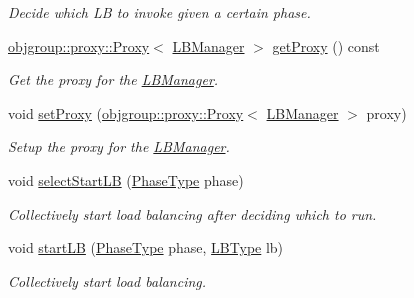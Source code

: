 \begin{DoxyCompactItemize}
\begin{DoxyCompactList}\small\item\em Decide which LB to invoke given a certain phase. \end{DoxyCompactList}\item 
\hyperlink{structvt_1_1objgroup_1_1proxy_1_1_proxy}{objgroup\+::proxy\+::\+Proxy}$<$ \hyperlink{structvt_1_1vrt_1_1collection_1_1balance_1_1_l_b_manager}{L\+B\+Manager} $>$ \hyperlink{structvt_1_1vrt_1_1collection_1_1balance_1_1_l_b_manager_aa0fbba6d90873e5fa6e40767efcabb5c}{get\+Proxy} () const
\begin{DoxyCompactList}\small\item\em Get the proxy for the \hyperlink{structvt_1_1vrt_1_1collection_1_1balance_1_1_l_b_manager}{L\+B\+Manager}. \end{DoxyCompactList}\item 
void \hyperlink{structvt_1_1vrt_1_1collection_1_1balance_1_1_l_b_manager_aacef5b639acd9d984b9bcb79ecb9c6a9}{set\+Proxy} (\hyperlink{structvt_1_1objgroup_1_1proxy_1_1_proxy}{objgroup\+::proxy\+::\+Proxy}$<$ \hyperlink{structvt_1_1vrt_1_1collection_1_1balance_1_1_l_b_manager}{L\+B\+Manager} $>$ proxy)
\begin{DoxyCompactList}\small\item\em Setup the proxy for the \hyperlink{structvt_1_1vrt_1_1collection_1_1balance_1_1_l_b_manager}{L\+B\+Manager}. \end{DoxyCompactList}\item 
void \hyperlink{structvt_1_1vrt_1_1collection_1_1balance_1_1_l_b_manager_aa21017c4513b87dccff2c3f0b12b00b4}{select\+Start\+LB} (\hyperlink{namespacevt_a46ce6733d5cdbd735d561b7b4029f6d7}{Phase\+Type} phase)
\begin{DoxyCompactList}\small\item\em Collectively start load balancing after deciding which to run. \end{DoxyCompactList}\item 
void \hyperlink{structvt_1_1vrt_1_1collection_1_1balance_1_1_l_b_manager_a7fcdb002711bd097086ca2d4f9413cdf}{start\+LB} (\hyperlink{namespacevt_a46ce6733d5cdbd735d561b7b4029f6d7}{Phase\+Type} phase, \hyperlink{namespacevt_1_1vrt_1_1collection_1_1balance_ac4f99693509affcc67db182d4aad9b5c}{L\+B\+Type} lb)
\begin{DoxyCompactList}\small\item\em Collectively start load balancing. \end{DoxyCompactList}\item 

\end{DoxyCompactItemize}
